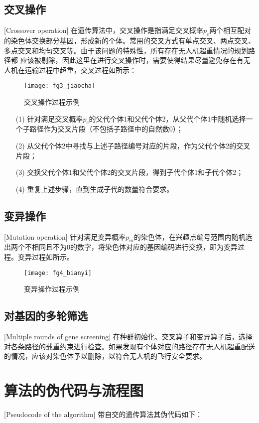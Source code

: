 \subsection{交叉操作}[Crossover operation]
在遗传算法中，交叉操作是指满足交叉概率$p_c$两个相互配对的染色体交换部分基因，形成新的个体。常用的交叉方式有单点交叉、两点交叉、多点交叉和均匀交叉等。由于该问题的特殊性，所有存在无人机超重情况的规划路径都
应该被剔除，因此这里在进行交叉操作时，需要使得结果尽量避免存在有无人机在运输过程中超重，交叉过程如所示：
\begin{figure}[ht]
	\centering
	\texttt{[image: fg3\_jiaocha]}
	\caption{交叉操作过程示例}
	\label{fg401}
\end{figure}


\begin{itemize}
	\item [(1)] 针对满足交叉概率$p_c$的父代个体1和父代个体2，从父代个体1中随机选择一个子路径作为交叉片段（不包括子路径中的自然数0）；
	\item [(2)] 从父代个体2中寻找与上述子路径编号对应的片段，作为父代个体2的交叉片段；
	\item [(3)] 交换父代个体1和父代个体2的交叉片段，得到子代个体1和子代个体2；
 	\item [(4)] 重复上述步骤，直到生成子代的数量符合要求。
\end{itemize}

\subsection{变异操作}[Mutation operation]
针对满足变异概率$p_m$的染色体，在兴趣点编号范围内随机选出两个不相同且不为0的数字，将染色体对应的基因编码进行交换，即为变异过程。变异过程如所示。
\begin{figure}[ht]
	\centering
	\texttt{[image: fg4\_bianyi]}
	\caption{变异操作过程示例}
	\label{fg402}
\end{figure}
\subsection{对基因的多轮筛选}[Multiple rounds of gene screening]
在种群初始化、交叉算子和变异算子后，选择对各条路径的载重约束进行检查。如果发现有个体对应的路径存在无人机超重配送的情况，应该对染色体予以删除，以符合无人机的飞行安全要求。

\section{算法的伪代码与流程图}[Pseudocode of the algorithm]
带自交的遗传算法其伪代码如下：


